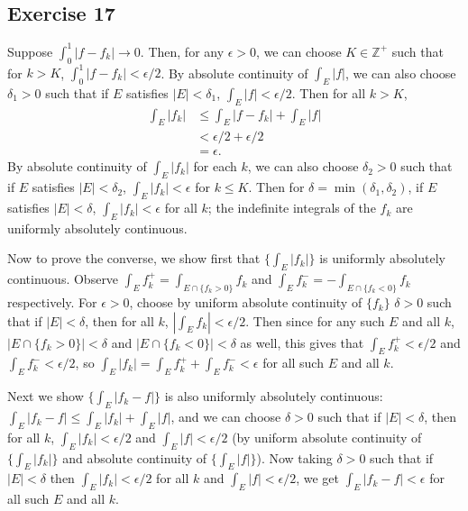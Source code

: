 \documentclass{article}
\newcommand\abs[1]{\left|#1\right|}
\begin{document}
\subsection{Exercise 17} %
Suppose $\int_{0}^{1} \abs{f - f_{k}} \rightarrow 0$. Then, for any $\epsilon > 0$, we can choose $K \in \mathbb{Z}^{+}$ such that for $k > K$, $\int_{0}^{1} \abs{f - f_{k}} < \epsilon / 2$. By absolute continuity of $\int_{E} \abs{f}$, we can also choose $\delta_{1} > 0$ such that if $E$ satisfies $\abs{E} < \delta_{1}$, $\int_{E} \abs{f} < \epsilon / 2$. Then for all $k > K$, 
\begin{align*}
	\int_{E} \abs{f_{k}} &\leq \int_{E} \abs{f - f_{k}} + \int_{E} \abs{f} \\
	&< \epsilon / 2 + \epsilon / 2 \\
	&= \epsilon.
\end{align*}
By absolute continuity of $\int_{E} \abs{f_{k}}$ for each $k$, we can also choose $\delta_{2} > 0$ such that if $E$ satisfies $\abs{E} < \delta_{2}$, $\int_{E} \abs{f_{k}} < \epsilon$ for $k \leq K$. Then for $\delta = \min(\delta_{1}, \delta_{2})$, if $E$ satisfies $\abs{E} < \delta$, $\int_{E} \abs{f_{k}} < \epsilon$ for all $k$; the indefinite integrals of the $f_{k}$ are uniformly absolutely continuous.

Now to prove the converse, we show first that $\{ \int_{E} \abs{f_{k}} \}$ is uniformly absolutely continuous. Observe $\int_{E} f_{k}^{+} = \int_{E \cap \{ f_{k} > 0 \}} f_{k}$ and $ \int_{E} f_{k}^{-} = -\int_{E \cap \{ f_{k} < 0 \}} f_{k}$ respectively. For $\epsilon > 0$, choose by uniform absolute continuity of $\{f_k\}$
$\delta > 0$ such that if $\abs{E} < \delta$, then for all $k$, $ \abs{\int_{E} f_{k}} < \epsilon / 2$. Then since for any such $E$ and all $k$, $\abs{E \cap \{ f_{k} > 0 \}} < \delta$ and $\abs{E \cap \{ f_{k} < 0 \}} < \delta$ as well, this gives that $\int_{E} f_{k}^{+} < \epsilon / 2$ and $\int_{E} f_{k}^{-} < \epsilon / 2$, so $\int_{E} \abs{f_{k}} = \int_{E} f_{k}^{+} + \int_{E} f_{k}^{-} < \epsilon$ for all such $E$ and all $k$.

Next we show $\{ \int_{E} \abs{f_{k} - f} \}$ is also uniformly absolutely continuous: $\int_{E} \abs{f_{k} - f} \leq \int_{E} \abs{f_{k}} + \int_{E} \abs{f}$, and we can choose $\delta > 0$ such that if $\abs{E} < \delta$, then for all $k$, $\int_{E} \abs{f_{k}} < \epsilon / 2$ and $\int_{E} \abs{f} < \epsilon / 2$ (by uniform absolute continuity of $\{ \int_{E} \abs{f_{k}} \}$ and absolute continuity of $\{ \int_{E} \abs{f} \}$). Now taking $\delta > 0$ such that if $\abs{E} < \delta$ then $\int_{E} \abs{f_{k}} < \epsilon / 2$ for all $k$ and $\int_{E} \abs{f} < \epsilon / 2$, we get $\int_{E} \abs{f_{k} - f} < \epsilon$ for all such $E$ and all $k$.
\end{document}
